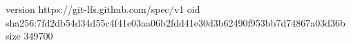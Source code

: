 version https://git-lfs.github.com/spec/v1
oid sha256:7fd2db54d34d55c4f41e03aa06b2fdd41e30d3b62490f953bb7d74867a03d36b
size 349700
